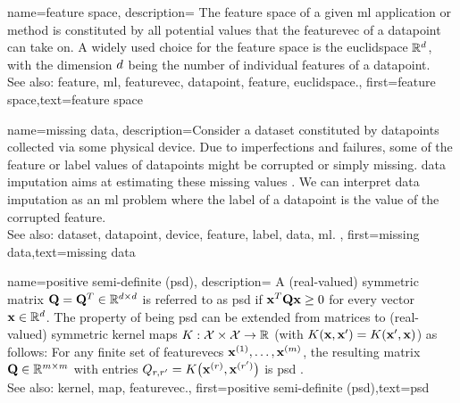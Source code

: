 {name={feature space},
	description={
		The \gls{feature} space of a given \gls{ml} application or method is 
		constituted by all potential values that the \gls{featurevec} of a \gls{datapoint} can 
		take on. A widely used choice for the \gls{feature} space is the \gls{euclidspace} $\mathbb{R}^{d}$, 
		with the dimension $d$ being the number of individual \glspl{feature} of a \gls{datapoint}.
				\\
		See also: \gls{feature}, \gls{ml}, \gls{featurevec}, \gls{datapoint}, \gls{feature}, \gls{euclidspace}.},
	first={feature space},text={feature space}  
}


{name={missing data},
	description={Consider a \gls{dataset} constituted by \glspl{datapoint} collected via 
		some physical \gls{device}. Due to imperfections and failures, some of the \gls{feature} 
		or \gls{label} values of \glspl{datapoint} might be corrupted or simply missing. 
		\Gls{data} imputation aims at estimating these missing values \cite{Abayomi2008DiagnosticsFM}. 
		We can interpret \gls{data} imputation as an \gls{ml} problem where the \gls{label} of a \gls{datapoint} is 
		the value of the corrupted \gls{feature}.
				\\
		See also: \gls{dataset}, \gls{datapoint}, \gls{device}, \gls{feature}, \gls{label}, \gls{data}, \gls{ml}. },
	first={missing data},text={missing data}  
}


{name={positive semi-definite (psd)},
	description=
	{A (real-valued) symmetric matrix $\mathbf{Q} = \mathbf{Q}^{T} \in \mathbb{R}^{d \times d}$ 
	 is referred to as psd if ${\bf x}^{T} \mathbf{Q} {\bf x} \geq 0$ for every vector ${\bf x} \in \mathbb{R}^{d}$. 
	 The property of being psd can be extended from matrices to (real-valued) 
	 symmetric \gls{kernel} \glspl{map} $K: \mathcal{X} \times \mathcal{X} \rightarrow \mathbb{R}$ 
	 (with $K({\bf x},{\bf x}') = K({\bf x}',{\bf x})$)
	 as follows: For any finite set of \glspl{featurevec} ${\bf x}^{(1)},\dots,{\bf x}^{(m)}$, 
	 the resulting matrix $\mathbf{Q} \in \mathbb{R}^{m \times m}$ with 
	entries $Q_{r,r'} = K\big({\bf x}^{(r)},{\bf x}^{(r')}\big)$ 
	is psd \cite{LearningKernelsBook}.
			\\
		See also: \gls{kernel}, \gls{map}, \gls{featurevec}.},
	first={positive semi-definite (psd)},text={psd}  
}

